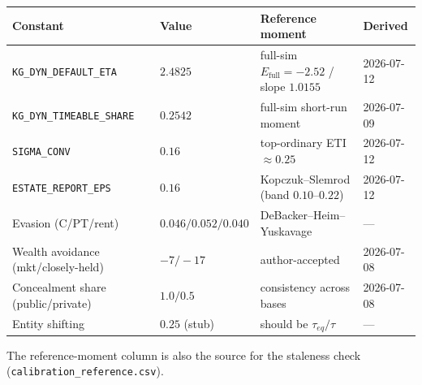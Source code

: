\documentclass[11pt]{article}
\newcommand{\code}[1]{\texttt{\small #1}}
\begin{document}
\begin{table}[h]
\centering\small
\begin{tabular}{@{}llll@{}}
\toprule
Constant & Value & Reference moment & Derived \\
\midrule
\code{KG_DYN_DEFAULT_ETA} & $2.4825$ & full-sim $E_{\text{full}}=-2.52$ / slope $1.0155$ & 2026-07-12 \\
\code{KG_DYN_TIMEABLE_SHARE} & $0.2542$ & full-sim short-run moment & 2026-07-09 \\
\code{SIGMA_CONV} & $0.16$ & top-ordinary ETI $\approx0.25$ & 2026-07-12 \\
\code{ESTATE_REPORT_EPS} & $0.16$ & Kopczuk--Slemrod (band $0.10$--$0.22$) & 2026-07-12 \\
Evasion (C/PT/rent) & $0.046/0.052/0.040$ & DeBacker--Heim--Yuskavage & --- \\
Wealth avoidance (mkt/closely-held) & $-7/-17$ & author-accepted & 2026-07-08 \\
Concealment share (public/private) & $1.0/0.5$ & consistency across bases & 2026-07-08 \\
Entity shifting & $0.25$ (stub) & should be $\tau_{eq}/\tau$ & --- \\
\bottomrule
\end{tabular}
\end{table}

\noindent The reference-moment column is also the source for the staleness check
(\code{calibration_reference.csv}).
\end{document}
